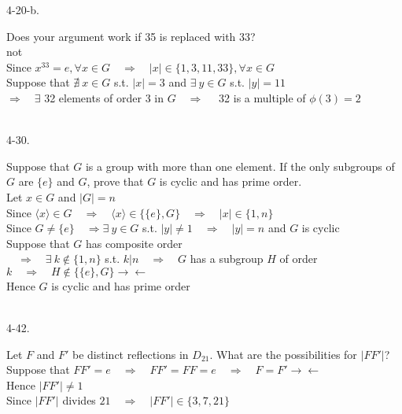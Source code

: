 \documentclass[12pt]{book}
\begin{document}
\begin{CJK}{UTF8}{bsmi}
4-20-b. \begin{minipage}[t]{\dimexpr\linewidth-2em}
Does your argument work if 35 is replaced with 33? \\
not \\
Since $x^{33}=e, \forall x\in G\quad\Rightarrow\quad |x|\in\{1,3,11,33\}, \forall x\in G$ \\
Suppose that $\nexists\ x\in G$ s.t. $|x|=3$ and $\exists\ y\in G$ s.t. $|y|=11$ \\
$\Rightarrow\quad\exists$ 32 elements of order 3 in $G\quad\Rightarrow\quad$ 32 is a multiple of $\phi(3)=2$
\end{minipage}\\

4-30. \begin{minipage}[t]{\dimexpr\linewidth-2em}
Suppose that $G$ is a group with more than one element. If the only subgroups of $G$ are $\{e\}$ and $G$, prove that $G$ is cyclic and has prime order. \\
Let $x\in G$  and $|G|=n$ \\
Since $\langle x\rangle\in G\quad\Rightarrow\quad\langle x\rangle\in\{\{e\}, G\}\quad\Rightarrow\quad|x|\in\{1, n\}$ \\
Since $G\ne\{e\}\quad\Rightarrow\exists\ y\in G$ s.t. $|y|\ne1\quad\Rightarrow\quad |y|=n$ and $G$ is cyclic \\
Suppose that $G$ has composite order \\
$\quad\Rightarrow\quad\exists\ k\not\in\{1, n\}$ s.t. $k|n\quad\Rightarrow\quad G$ has a subgroup $H$ of order $k\quad\Rightarrow\quad H\not\in\{\{e\}, G\}\rightarrow\leftarrow$ \\
Hence $G$ is cyclic and has prime order
\end{minipage}\\

4-42. \begin{minipage}[t]{\dimexpr\linewidth-2em}
Let $F$ and $F'$ be distinct reflections in $D_{21}$. What are the possibilities for $|FF'|$? \\
Suppose that $FF'=e\quad\Rightarrow\quad FF'=FF=e\quad\Rightarrow\quad F=F'\rightarrow\leftarrow$ \\
Hence $|FF'|\ne 1$ \\
Since $|FF'|$ divides $ 21\quad\Rightarrow\quad |FF'|\in\{3,7,21\}$
\end{minipage}\\

\end{CJK}
\end{document}
